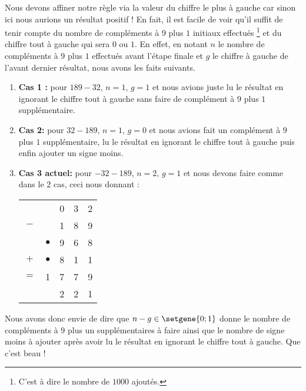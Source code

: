 Nous devons affiner notre règle via la valeur du chiffre le plus à gauche car sinon ici nous aurions un résultat positif !
En fait, il est facile de voir qu'il suffit de tenir compte du nombre de compléments à $9$ plus $1$ initiaux effectués
\footnote{
	C'est à dire le nombre de $1000$ ajoutés.
}
et du chiffre tout à gauche qui sera $0$ ou $1$.
En effet, en notant $n$ le nombre de compléments à $9$ plus $1$ effectués avant l'étape finale et $g$ le chiffre à gauche de l'avant dernier résultat, nous avons les faits suivants.

\begin{enumerate}
	\item \textbf{Cas 1 :} pour $189 - 32$, $n = 1$, $g = 1$ et nous avions juste lu le résultat en ignorant le chiffre tout à gauche sans faire de complément à $9$ plus $1$ supplémentaire.


	\item \textbf{Cas 2:} pour $32 - 189$, $n = 1$, $g = 0$ et nous avions fait un complément à $9$ plus $1$ supplémentaire, lu le résultat en ignorant le chiffre tout à gauche puis enfin ajouter un signe moins.


	\item \textbf{Cas 3 actuel:} pour $-32 - 189$, $n = 2$, $g = 1$ et nous devons faire comme dans le 2\ieme{} cas, ceci nous donnant :

    \begin{center}
    \begin{tabular}{ccccc}
    	    & \sign{-}  & 0 & 3 & 2 \\
    	$-$ &           & 1 & 8 & 9 \\
    	\hline
    	\hline
    	    & $\bullet$ & 9 & 6 & 8 \\
    	$+$ & $\bullet$ & 8 & 1 & 1 \\
    	\hline
        $=$ & 1         & 7 & 7 & 9 \\
    	\hline
    	\hline
            & \sign{-}  & 2 & 2 & 1 \\
    \end{tabular}
    \end{center}
\end{enumerate}


Nous avons donc envie de dire que $n - g \in \setgene{0 ; 1}$ donne le nombre de compléments à $9$ plus un supplémentaires à faire ainsi que le nombre de signe moins à ajouter après avoir lu le résultat en ignorant le chiffre tout à gauche. Que c'est beau !

\smallskip

